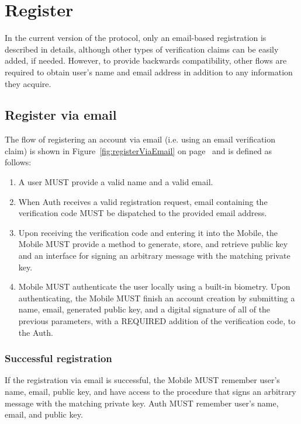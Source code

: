 \section{Register}
In the current version of the protocol, only an email-based registration is described in details, although 	
other types of verification claims can be easily added, if needed. However, to provide backwards compatibility,
other flows are required to obtain user's name and email address in addition to any information they acquire.

      \subsection{Register via email}
      The flow of registering an account via email (i.e. using an email verification claim) is shown in 
      Figure~\ref{fig:registerViaEmail} on page~\pageref{fig:registerViaEmail} and is defined as follows:
      \begin{enumerate}
            \item A user MUST provide a valid name and a valid email.
            \item When Auth receives a valid registration request, email containing the verification code MUST 
                  be dispatched to the provided email address.
            \item Upon receiving the verification code and entering it into the Mobile, the Mobile MUST provide 
                  a method to generate, store, and retrieve public key and an interface for signing an arbitrary 
                  message with the matching private key.
            \item Mobile MUST authenticate the user locally using a built-in biometry. Upon authenticating, 
                  the Mobile MUST finish an account creation by submitting a name, email, generated public key, 
                  and a digital signature of all of the previous parameters, with a REQUIRED addition of the 
                  verification code, to the Auth.
      \end{enumerate}  
                 
      
            \subsubsection{Successful registration}
            If the registration via email is successful, the Mobile MUST remember user's name, email, public key, and 
            have access to the procedure that signs an arbitrary message with the matching private key. Auth MUST 
            remember user's name, email, and public key.

